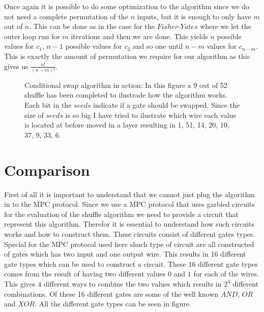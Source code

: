 \bigskip
Once again it is possible to do some optimization to the algorithm since we do not need a complete permutation of the $n$ inputs, but it is enough to only have $m$ out of $n$. This can be done as in the case for the $Fisher\text{-}Yates$ where we let the outer loop run for $m$ iterations and then we are done. This yields $n$ possible values for $c_1$, $n-1$ possible values for $c_2$ and so one until $n-m$ values for $c_{n-m}$. This is exactly the amount of permutation we require for our algorithm as this gives us $\frac{n!}{(n-m)!}$.

\begin{figure}
\label{con_swap_fig}
\centering
\scalebox{1.5}{}
\caption{Conditional swap algorithm in action: In this figure a 9 out of 52 shuffle has been completed to ilustrade how the algorithm works. Each bit in the $seeds$ indicate if a gate should be swapped. Since the size of $seeds$ is so big I have tried to ilustrate which wire each value is located at before moved in a layer resulting in 1, 51, 14, 20, 10, 37, 9, 33, 6.}
\end{figure}


\section{Comparison}
First of all it is important to understand that we cannot just plug the algorithm in to the MPC protocol. Since we use a MPC protocol that uses garbled circuits for the evaluation of the shuffle algorithm we need to provide a circuit that represent this algorithm. Therefor it is essential to understand how such circuits works and how to construct them. These circuits consist of different gates types. Special for the MPC protocol used here shuch type of circuit are all constructed of gates which has two input and one output wire. This results in 16 different gate types which can be used to construct a circuit. These 16 different gate types comes from the result of having two different values $0$ and $1$ for each of the wires. This gives $4$ different ways to combine the two values which results in $2^4$ different combinations. Of these 16 different gates are some of the well known $AND$, $OR$ and $XOR$. All the different gate types can be seen in figure.

